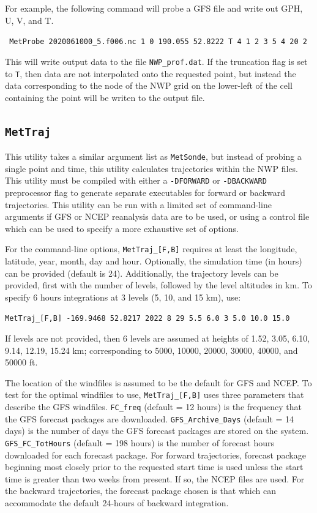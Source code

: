\documentclass[11pt]{article}   %
\begin{document}
For example, the following command will probe a GFS file and write out
GPH, U, V, and T.

\verb| MetProbe 2020061000_5.f006.nc 1 0 190.055 52.8222 T 4 1 2 3 5 4 20 2 |

This will write output data to the file \texttt{NWP\_prof.dat}.
If the truncation flag is set to \texttt{T}, then data are not interpolated onto
the requested point, but instead the data corresponding to the node of the NWP
grid on the lower-left of the cell containing the point will be writen to the output file.

\subsection{\texttt{MetTraj}}

This utility takes a similar argument list as \texttt{MetSonde}, but instead of
probing a single point and time, this utility calculates trajectories within
the NWP files.
This utility must be compiled with either a \texttt{-DFORWARD} or \texttt{-DBACKWARD}
preprocessor flag to generate separate executables for forward or backward trajectories.
This utility can be run with a limited set of command-line arguments if GFS or NCEP
reanalysis data are to be used, or using a control file which can be used to specify
a more exhaustive set of options.

For the command-line options, \texttt{MetTraj\_[F,B]} requires at least the longitude,
latitude, year, month, day and hour.  Optionally, the simulation time (in hours) can
be provided (default is 24).  Additionally, the trajectory levels can be provided,
first with the number of
levels, followed by the level altitudes in km.  To specify 6 hours
integrations at 3 levels (5, 10, and 15 km), use:

\verb|MetTraj_[F,B] -169.9468 52.8217 2022 8 29 5.5 6.0 3 5.0 10.0 15.0 |

If levels are not provided, then 6 levels are assumed at heights of 1.52,
3.05, 6.10, 9.14, 12.19, 15.24 km; corresponding to 5000, 10000, 20000, 30000,
40000, and 50000 ft.

The location of the windfiles is assumed to be the default for GFS and NCEP.
To test for the optimal windfiles to use, \texttt{MetTraj\_[F,B]} uses three
parameters that describe the GFS windfiles.
\texttt{FC\_freq} (default = 12 hours) is the frequency that the GFS forecast
packages are downloaded.  
\texttt{GFS\_Archive\_Days} (default = 14 days) is the number of days the GFS
forecast packages are stored on the system.
\texttt{GFS\_FC\_TotHours} (default = 198 hours) is the number of forecast hours
downloaded for each forecast package.
For  forward trajectories, forecast package beginning most closely prior to the requested
start time is used unless the start time is greater than two weeks from present.  If
so, the NCEP files are used.  For the backward trajectories, the forecast package
chosen is that which can accommodate the default 24-hours of backward integration.
\end{document}
